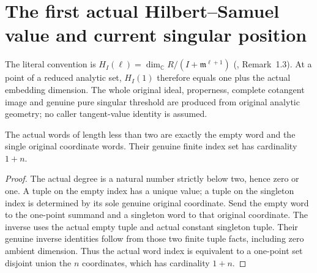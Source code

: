 \section{The first actual Hilbert--Samuel value and current singular position}
\label{sec:hironaka-hilbert-samuel-tangent-value}

The literal convention is
$H_I(\ell)=\dim_{\mathbb C}R/(I+\mathfrak m^{\ell+1})$
(\cite{bierstone-milman97-invent-math}, Remark~1.3).
At a point of a reduced analytic set, $H_I(1)$ therefore equals one plus
the actual embedding dimension. The whole original ideal, properness,
complete cotangent image and genuine pure singular threshold are produced
from original analytic geometry; no caller tangent-value identity is assumed.

\begin{lemma}
\label{hir:actual-first-coordinate-word-dictionary}
\leanok
{}
The actual words of length less than two are exactly the empty word and the
single original coordinate words. Their genuine finite index set has
cardinality $1+n$.
\end{lemma}
\begin{proof}
The actual degree is a natural number strictly below two, hence zero or
one. A tuple on the empty index has a unique value; a tuple on the singleton
index is determined by its sole genuine original coordinate. Send the
empty word to the one-point summand and a singleton word to that original
coordinate. The inverse uses the actual empty tuple and actual constant
singleton tuple. Their genuine inverse identities follow from those two
finite tuple facts, including zero ambient dimension. Thus the actual word
index is equivalent to a one-point set disjoint union the $n$ coordinates,
which has cardinality $1+n$.
\end{proof}

